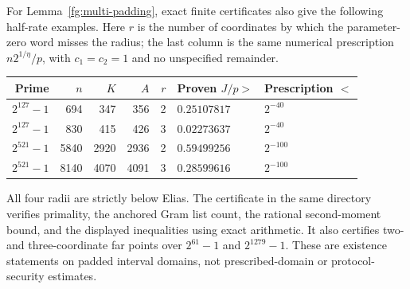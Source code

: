 

For Lemma~\ref{fg:multi-padding}, exact finite certificates also give
the following half-rate examples.
Here $r$ is the number of coordinates by which the parameter-zero word
misses the radius; the last column is the same numerical prescription
$n2^{1/\eta}/p$, with $c_1=c_2=1$ and no unspecified remainder.
\begin{center}
\begin{tabular}{@{}rrrrrll@{}}
\toprule
Prime & $n$ & $K$ & $A$ & $r$ & Proven $J/p>$ & Prescription $<$\\
\midrule
$2^{127}-1$&694&347&356&2&$0.25107817$&$2^{-40}$\\
$2^{127}-1$&830&415&426&3&$0.02273637$&$2^{-40}$\\
$2^{521}-1$&5840&2920&2936&2&$0.59499256$&$2^{-100}$\\
$2^{521}-1$&8140&4070&4091&3&$0.28599616$&$2^{-100}$\\
\bottomrule
\end{tabular}
\end{center}
All four radii are strictly below Elias. The certificate
 in the same directory verifies
primality, the anchored Gram list count, the rational second-moment
bound, and the displayed inequalities using exact arithmetic.
It also certifies two- and three-coordinate far points over $2^{61}-1$
and $2^{1279}-1$. These are existence statements on padded interval
domains, not prescribed-domain or protocol-security estimates.

